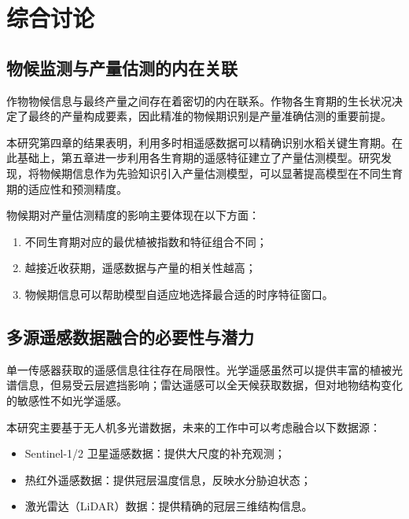 
\chapter{综合讨论}
\label{chap:general_discussion}

\section{物候监测与产量估测的内在关联}
\label{sec:phenology_yield_relation}

作物物候信息与最终产量之间存在着密切的内在联系。作物各生育期的生长状况决定了最终的产量构成要素，因此精准的物候期识别是产量准确估测的重要前提\cite{ref2}。

本研究第四章的结果表明，利用多时相遥感数据可以精确识别水稻关键生育期。在此基础上，第五章进一步利用各生育期的遥感特征建立了产量估测模型。研究发现，将物候期信息作为先验知识引入产量估测模型，可以显著提高模型在不同生育期的适应性和预测精度。

物候期对产量估测精度的影响主要体现在以下方面：
\begin{enumerate}[itemsep=0pt,parsep=0pt]
  \item 不同生育期对应的最优植被指数和特征组合不同；
  \item 越接近收获期，遥感数据与产量的相关性越高；
  \item 物候期信息可以帮助模型自适应地选择最合适的时序特征窗口。
\end{enumerate}

\section{多源遥感数据融合的必要性与潜力}
\label{sec:multi_source}

单一传感器获取的遥感信息往往存在局限性。光学遥感虽然可以提供丰富的植被光谱信息，但易受云层遮挡影响；雷达遥感可以全天候获取数据，但对地物结构变化的敏感性不如光学遥感\cite{ref1}。

本研究主要基于无人机多光谱数据，未来的工作中可以考虑融合以下数据源：
\begin{itemize}[itemsep=0pt,parsep=0pt]
  \item Sentinel-1/2 卫星遥感数据：提供大尺度的补充观测；
  \item 热红外遥感数据：提供冠层温度信息，反映水分胁迫状态；
  \item 激光雷达（LiDAR）数据：提供精确的冠层三维结构信息。
\end{itemize}

